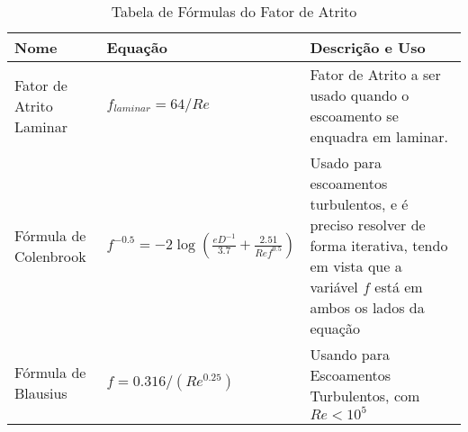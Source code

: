 \documentclass{article}
\begin{document}
\begin{table}[h]
    \begin{tabularx}{\textwidth}{|X|X|X|}\hline
        \textbf{Nome}           & \textbf{Equação}                                                               & \textbf{Descrição e Uso}                                                                                                                         \\ \hline
        Fator de Atrito Laminar & $f_{laminar} = 64/Re$                                                          & Fator de Atrito a ser usado quando o escoamento se enquadra em laminar.                                                                          \\ \hline
        Fórmula de Colenbrook   & $f^{-0.5} = -2 \log\left(\frac{eD^{-1}}{3.7} + \frac{2.51}{Re f^{0.5}}\right)$ & Usado para escoamentos turbulentos, e é preciso resolver de forma iterativa, tendo em vista que a variável $f$ está em ambos os lados da equação \\ \hline
        Fórmula de Blausius     & $f = 0.316/(Re^{0.25})$                                                        & Usando para Escoamentos Turbulentos, com $Re<10^5$                                                                                               \\ \hline
    \end{tabularx}
    \caption{Tabela de Fórmulas do Fator de Atrito}
    \label{tab:fator_atrito}
\end{table}
\end{document}
